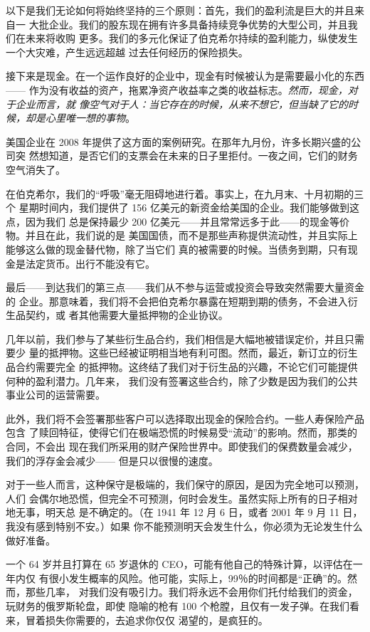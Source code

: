 \documentclass[UTF8,a4paper,zihao=-4,fontset = windows]{ctexart} %
\begin{document}
\begin{itemize}
以下是我们无论如何将始终坚持的三个原则：首先，我们的盈利流是巨大的并且来自一
大批企业。我们的股东现在拥有许多具备持续竞争优势的大型公司，并且我们在未来将收购
更多。我们的多元化保证了伯克希尔持续的盈利能力，纵使发生一个大灾难，产生远远超越
过去任何经历的保险损失。

接下来是现金。在一个运作良好的企业中，现金有时候被认为是需要最小化的东西——
作为没有收益的资产，拖累净资产收益率之类的收益标志。\textit{然而，现金，对于企业而言，就
像空气对于人：当它存在的时候，从来不想它，但当缺了它的时候，却是心里唯一想的事物}。

美国企业在 2008 年提供了这方面的案例研究。在那年九月份，许多长期兴盛的公司突
然想知道，是否它们的支票会在未来的日子里拒付。一夜之间，它们的财务空气消失了。

在伯克希尔，我们的“呼吸”毫无阻碍地进行着。事实上，在九月末、十月初期的三个
星期时间内，我们提供了 156 亿美元的新资金给美国的企业。我们能够做到这点，因为我们
总是保持最少 200 亿美元——并且常常远多于此——的现金等价物。并且在此，我们说的是
美国国债，而不是那些声称提供流动性，并且实际上能够这么做的现金替代物，除了当它们
真的被需要的时候。当债务到期，只有现金是法定货币。出行不能没有它。

最后——到达我们的第三点——我们从不参与运营或投资会导致突然需要大量资金的
企业。那意味着，我们将不会把伯克希尔暴露在短期到期的债务，不会进入衍生品契约，或
者其他需要大量抵押物的企业协议。

几年以前，我们参与了某些衍生品合约，我们相信是大幅地被错误定价，并且只需要少
量的抵押物。这些已经被证明相当地有利可图。然而，最近，新订立的衍生品合约需要完全
的抵押物。这终结了我们对于衍生品的兴趣，不论它们可能提供何种的盈利潜力。几年来，
我们没有签署这些合约，除了少数是因为我们的公共事业公司的运营需要。

此外，我们将不会签署那些客户可以选择取出现金的保险合约。一些人寿保险产品包含
了赎回特征，使得它们在极端恐慌的时候易受“流动”的影响。然而，那类的合同，不会出
现在我们所采用的财产保险世界中。即使我们的保费数量会减少，我们的浮存金会减少——
但是只以很慢的速度。

对于一些人而言，这种保守是极端的，我们保守的原因，是因为完全地可以预测，人们
会偶尔地恐慌，但完全不可预测，何时会发生。虽然实际上所有的日子相对地无事，明天总
是不确定的。（在 1941 年 12 月 6 日，或者 2001 年 9 月 11 日，我没有感到特别不安。）如果
你不能预测明天会发生什么，你必须为无论发生什么做好准备。

一个 64 岁并且打算在 65 岁退休的 CEO，可能有他自己的特殊计算，以评估在一年内仅
有很小发生概率的风险。他可能，实际上，99％的时间都是“正确”的。然而，那些几率，
对我们没有吸引力。我们将永远不会用你们托付给我们的资金，玩财务的俄罗斯轮盘，即使
隐喻的枪有 100 个枪膛，且仅有一发子弹。在我们看来，冒着损失你需要的，去追求你仅仅
渴望的，是疯狂的。


\end{itemize}
\end{document}
